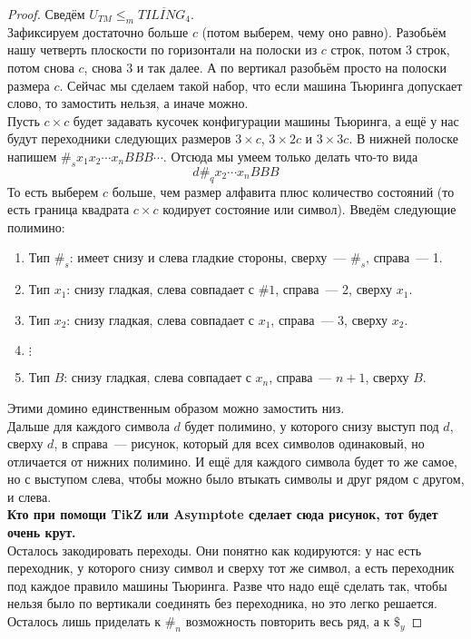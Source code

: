 \documentclass{article}
\begin{document}
    \begin{proof}
        Сведём $U_{TM}\leqslant_m\overline{TILING_4}$.\\
        Зафиксируем достаточно больше $c$ (потом выберем, чему оно равно). Разобьём нашу четверть плоскости по горизонтали на полоски из $c$ строк, потом 3 строк, потом снова $c$, снова 3 и так далее. А по вертикал разобьём просто на полоски размера $c$. Сейчас мы сделаем такой набор, что если машина Тьюринга допускает слово, то замостить нельзя, а иначе можно.\\
        Пусть $c\times c$ будет задавать кусочек конфигурации машины Тьюринга, а ещё у нас будут переходники следующих размеров $3\times c$, $3\times 2c$ и $3\times 3c$. В нижней полоске напишем $\#_sx_1x_2\cdots x_nBBB\cdots$. Отсюда мы умеем только делать что-то вида
        $$
        d\#_qx_2\cdots x_nBBB
        $$
        То есть выберем $c$ больше, чем размер алфавита плюс количество состояний (то есть граница квадрата $c\times c$ кодирует состояние или символ). Введём следующие полимино:
        \begin{enumerate}
            \item Тип $\#_s$: имеет снизу и слева гладкие стороны, сверху~--- $\#_s$, справа~--- 1.
            \item Тип $x_1$: снизу гладкая, слева совпадает с $\#1$, справа~--- 2, сверху $x_1$.
            \item Тип $x_2$: снизу гладкая, слева совпадает с $x_1$, справа~--- 3, сверху $x_2$.
            \item $\vdots$
            \item Тип $B$: снизу гладкая, слева совпадает с $x_n$, справа~--- $n+1$, сверху $B$.
        \end{enumerate}
        Этими домино единственным образом можно замостить низ.\\
        Дальше для каждого символа $d$ будет полимино, у которого снизу выступ под $d$, сверху $d$, в справа~--- рисунок, который для всех символов одинаковый, но отличается от нижних полимино. И ещё для каждого символа будет то же самое, но с выступом слева, чтобы можно было втыкать символы и друг рядом с другом, и слева.\\
        {\bf\LARGE Кто при помощи TikZ или Asymptote сделает сюда рисунок, тот будет очень крут.\\}
        Осталось закодировать переходы. Они понятно как кодируются: у нас есть переходник, у которого снизу символ и сверху тот же символ, а есть переходник под каждое правило машины Тьюринга. Разве что надо ещё сделать так, чтобы нельзя было по вертикали соединять без переходника, но это легко решается.\\
        Осталось лишь приделать к $\#_n$ возможность повторить весь ряд, а к $\$_y$
    \end{proof}
\end{document}
